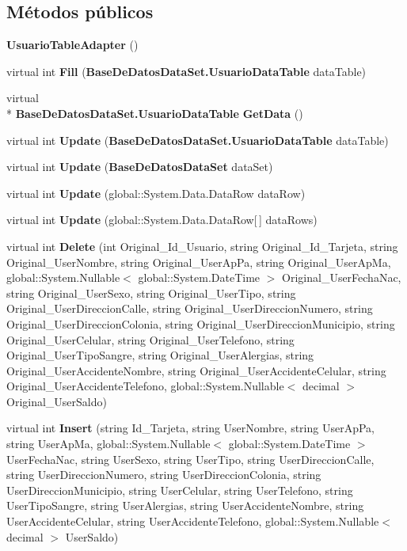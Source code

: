 \subsection*{Métodos públicos}
\begin{DoxyCompactItemize}
\item 
{\bf Usuario\-Table\-Adapter} ()
\item 
virtual int {\bf Fill} ({\bf Base\-De\-Datos\-Data\-Set.\-Usuario\-Data\-Table} data\-Table)
\item 
virtual \\*
{\bf Base\-De\-Datos\-Data\-Set.\-Usuario\-Data\-Table} {\bf Get\-Data} ()
\item 
virtual int {\bf Update} ({\bf Base\-De\-Datos\-Data\-Set.\-Usuario\-Data\-Table} data\-Table)
\item 
virtual int {\bf Update} ({\bf Base\-De\-Datos\-Data\-Set} data\-Set)
\item 
virtual int {\bf Update} (global\-::\-System.\-Data.\-Data\-Row data\-Row)
\item 
virtual int {\bf Update} (global\-::\-System.\-Data.\-Data\-Row[$\,$] data\-Rows)
\item 
virtual int {\bf Delete} (int Original\-\_\-\-Id\-\_\-\-Usuario, string Original\-\_\-\-Id\-\_\-\-Tarjeta, string Original\-\_\-\-User\-Nombre, string Original\-\_\-\-User\-Ap\-Pa, string Original\-\_\-\-User\-Ap\-Ma, global\-::\-System.\-Nullable$<$ global\-::\-System.\-Date\-Time $>$ Original\-\_\-\-User\-Fecha\-Nac, string Original\-\_\-\-User\-Sexo, string Original\-\_\-\-User\-Tipo, string Original\-\_\-\-User\-Direccion\-Calle, string Original\-\_\-\-User\-Direccion\-Numero, string Original\-\_\-\-User\-Direccion\-Colonia, string Original\-\_\-\-User\-Direccion\-Municipio, string Original\-\_\-\-User\-Celular, string Original\-\_\-\-User\-Telefono, string Original\-\_\-\-User\-Tipo\-Sangre, string Original\-\_\-\-User\-Alergias, string Original\-\_\-\-User\-Accidente\-Nombre, string Original\-\_\-\-User\-Accidente\-Celular, string Original\-\_\-\-User\-Accidente\-Telefono, global\-::\-System.\-Nullable$<$ decimal $>$ Original\-\_\-\-User\-Saldo)
\item 
virtual int {\bf Insert} (string Id\-\_\-\-Tarjeta, string User\-Nombre, string User\-Ap\-Pa, string User\-Ap\-Ma, global\-::\-System.\-Nullable$<$ global\-::\-System.\-Date\-Time $>$ User\-Fecha\-Nac, string User\-Sexo, string User\-Tipo, string User\-Direccion\-Calle, string User\-Direccion\-Numero, string User\-Direccion\-Colonia, string User\-Direccion\-Municipio, string User\-Celular, string User\-Telefono, string User\-Tipo\-Sangre, string User\-Alergias, string User\-Accidente\-Nombre, string User\-Accidente\-Celular, string User\-Accidente\-Telefono, global\-::\-System.\-Nullable$<$ decimal $>$ User\-Saldo)

\end{DoxyCompactItemize}
